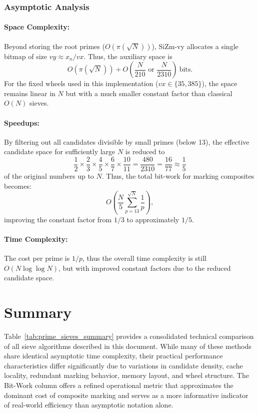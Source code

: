 \documentclass{article}
\begin{document}
\subsubsection*{Asymptotic Analysis}

\paragraph{Space Complexity:}
Beyond storing the root primes ($O(\pi(\sqrt{N}))$), SiZm-vy allocates a single bitmap of size $vy \approx x_n/vx$.
Thus, the auxiliary space is
\[
O(\pi(\sqrt{N})) + O\left(\frac{N}{210} \text{ or } \frac{N}{2310}\right)\ \text{bits}.
\]
For the fixed wheels used in this implementation ($vx\in\{35,385\}$), the space remains linear in $N$ but with a much smaller constant factor than classical $O(N)$ sieves.

\paragraph{Speedups:}
By filtering out all candidates divisible by small primes (below 13), the effective candidate space for sufficiently large $N$ is reduced to
\[
\frac{1}{2} \times \frac{2}{3} \times \frac{4}{5} \times \frac{6}{7} \times \frac{10}{11} = \frac{480}{2310} = \frac{16}{77} \approx \frac{1}{5}
\]
of the original numbers up to $N$.
Thus, the total bit-work for marking composites becomes:
\[
O\left(\frac{N}{5}\sum_{p=13}^{\sqrt N}\frac{1}{p}\right),
\]
improving the constant factor from $1/3$ to approximately $1/5$.

\paragraph{Time Complexity:}
The cost per prime is $1/p$, thus the overall time complexity is still $O(N \log \log N)$, but with improved constant factors due to the reduced candidate space.

\newpage

\section{Summary}

Table~\ref{tab:prime_sieves_summary} provides a consolidated technical comparison of all sieve algorithms described in this document. While many of these methods share identical asymptotic time complexity, their practical performance characteristics differ significantly due to variations in candidate density, cache locality, redundant marking behavior, memory layout, and wheel structure. The Bit-Work column offers a refined operational metric that approximates the dominant cost of composite marking and serves as a more informative indicator of real-world efficiency than asymptotic notation alone.
\end{document}
